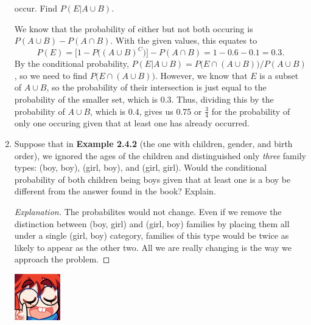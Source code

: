 \documentclass{article}
\begin{document}
\begin{enumerate}
    occur. Find \(P(E|A\cup{}B)\).\begin{solution}
        We know that the probability of either but not both occuring is \(P(A\cup{}B) - P(A\cap{}B)\). With the given values, this equates to \[
            P(E) = \bigl[1 - P\bigl({(A\cup{}B)}^C\bigr) \bigr] - P(A\cap{}B) = 1 - 0.6 -0.1 = 0.3.
        \] By the conditional probability, \(P(E|A\cup{}B) = P\bigl(E\cap{}(A\cup{}B)\bigr) / P(A\cup{}B) \), so we need to find \(P\bigl(E\cap{}(A\cup{}B)\bigr)\). However, we know that 
        \(E\) is a subset of \(A\cup{}B\), so the probability of their intersection is just equal to the probability of the smaller set, which is 0.3. Thus, dividing this by the probability 
        of \(A\cup{}B\), which is 0.4, gives us 0.75 or \(\frac{3}{4}\) for the probability of only one occuring given that at least one has already occurred. 
    \end{solution}
    \item Suppose that in \textbf{Example 2.4.2} (the one with children, gender, and birth order), we ignored the ages of the children and distinguished only \textit{three} family types: (boy, boy), 
    (girl, boy), and (girl, girl). Would the conditional probability of both children being boys given that at least one is a boy be different from the answer found in the book? Explain.\begin{proof}[Explanation]
        The probabilites would not change. Even if we remove the distinction between (boy, girl) and (girl, boy) families by placing them all under a single (girl, boy) category, 
        families of this type would be twice as likely to appear as the other two. All we are really changing is the way we approach the problem. 
    \end{proof}
    \begin{minipage}[t]{.14\textwidth}
        \vspace{0pt}
        \includegraphics[width=2cm]{nerd_maddy.png} 
    \end{minipage}%
\end{enumerate}
\end{document}
